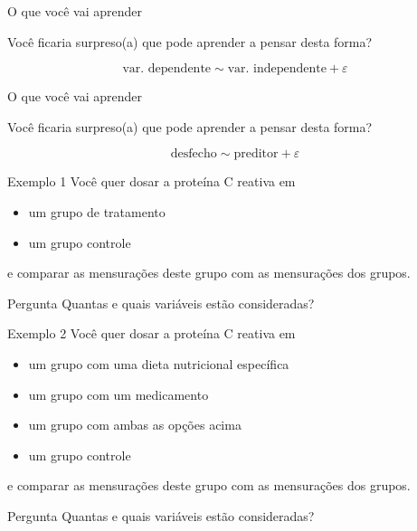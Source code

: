 \documentclass{beamer}
\begin{document}
\begin{frame}{\scriptsize O que você vai aprender}
  \begin{block}{}
    \footnotesize
    Você ficaria surpreso(a) que pode aprender a pensar desta forma?
  \end{block}

  $$\text{var. dependente} \sim \text{var. independente} + \varepsilon$$
\end{frame}

\begin{frame}{\scriptsize O que você vai aprender}
  \begin{block}{}
    \footnotesize
    Você ficaria surpreso(a) que pode aprender a pensar desta forma?
  \end{block}

  $$\text{desfecho} \sim \text{preditor} + \varepsilon$$
\end{frame}

\begin{frame}{\scriptsize }
  \begin{exampleblock}{Exemplo 1}
    \footnotesize
    Você quer dosar a proteína C reativa em
    \begin{itemize}
    \item um grupo de tratamento
    \item um grupo controle
    \end{itemize}
    e comparar as mensurações deste grupo com as mensurações dos grupos.
  \end{exampleblock}
  \begin{block}{Pergunta}
    \footnotesize
    Quantas e quais variáveis estão consideradas?
  \end{block}
\end{frame}

\begin{frame}{\scriptsize }
  \begin{exampleblock}{Exemplo 2}
    \footnotesize
    Você quer dosar a proteína C reativa em
    \begin{itemize}
    \footnotesize
    \item um grupo com uma dieta nutricional específica
    \item um grupo com um medicamento
    \item um grupo com ambas as opções acima
    \item um grupo controle
    \end{itemize}
    e comparar as mensurações deste grupo com as mensurações dos grupos.
  \end{exampleblock}
  \begin{block}{Pergunta}
    \footnotesize
    Quantas e quais variáveis estão consideradas?
  \end{block}
\end{frame}
\end{document}
